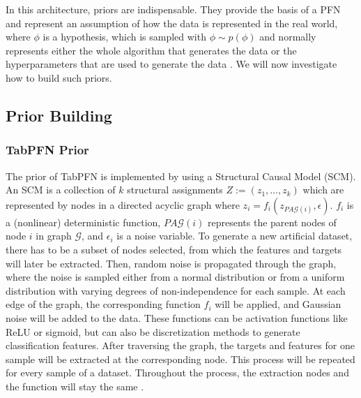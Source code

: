 In this architecture, priors are indispensable.
They provide the basis of a PFN and represent an assumption of how the data is represented in the real world, where $\phi$ is a hypothesis, which is sampled with $\phi \sim p(\phi)$ and normally represents either the whole algorithm that generates the data or the hyperparameters that are used to generate the data \citep{hollmann2022tabpfn}.
We will now investigate how to build such priors.
\subsection{Prior Building}
\label{subsec:prior_building}
\subsubsection{TabPFN Prior}
The prior of TabPFN is implemented by using a Structural Causal Model (SCM).
\newline
An SCM is a collection of $k$ structural assignments $Z:=(z_1, …, z_k)$ which are represented by nodes in a directed acyclic graph where $z_i = f_i(z_{PA\mathcal{G}(i)}, \epsilon)$.
$f_i$ is a (nonlinear) deterministic function, $PA\mathcal{G}(i)$ represents the parent nodes of node $i$ in graph $\mathcal{G}$, and $\epsilon_i$ is a noise variable. \newline
To generate a new artificial dataset, there has to be a subset of nodes selected, from which the features and targets will later be extracted.
Then, random noise is propagated through the graph, where the noise is sampled either from a normal distribution or from a uniform distribution with varying degrees of non-independence for each sample.
At each edge of the graph, the corresponding function $f_i$ will be applied, and Gaussian noise will be added to the data.
These functions can be activation functions like ReLU or sigmoid, but can also be discretization methods to generate classification features.\newline
After traversing the graph, the targets and features for one sample will be extracted at the corresponding node.
This process will be repeated for every sample of a dataset.
Throughout the process, the extraction nodes and the function will stay the same \citep{hollmann2025accurate}.

